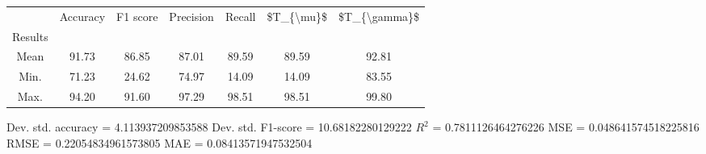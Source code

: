 \begin{tabular}{|c|c|c|c|c|c|c|}
\toprule
{} &  Accuracy &  F1 score &  Precision &  Recall &  \$T\_\{\textbackslash mu\}\$ &  \$T\_\{\textbackslash gamma\}\$ \\
Results &           &           &            &         &            &               \\
\hline
Mean    &     91.73 &     86.85 &      87.01 &   89.59 &      89.59 &         92.81 \\
Min.    &     71.23 &     24.62 &      74.97 &   14.09 &      14.09 &         83.55 \\
Max.    &     94.20 &     91.60 &      97.29 &   98.51 &      98.51 &         99.80 \\
\bottomrule
\end{tabular}

 Dev. std. accuracy = 4.113937209853588
 Dev. std. F1-score = 10.68182280129222
 $R^2$ = 0.7811126464276226
 MSE = 0.048641574518225816
 RMSE = 0.22054834961573805
 MAE = 0.08413571947532504